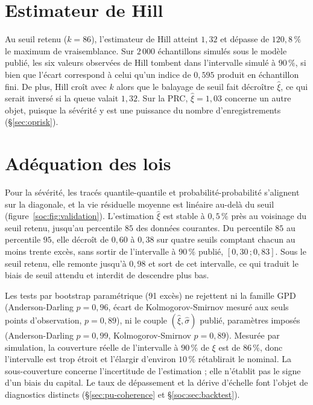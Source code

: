 \section{Estimateur de Hill}


Au seuil retenu ($k=86$), l'estimateur de Hill \citep{Hill1975} atteint $1{,}32$ et dépasse de
$120{,}8\,\%$ le maximum de vraisemblance. Sur $2\,000$ échantillons simulés sous le modèle publié,
les six valeurs observées de Hill tombent dans l'intervalle simulé à $90\,\%$, si bien que l'écart
correspond à celui qu'un indice de $0{,}595$ produit en échantillon fini. De plus, Hill croît avec $k$ alors que
le balayage de seuil fait décroître $\hat\xi$, ce qui serait inversé si la queue valait $1{,}32$.
Sur la PRC, $\hat\xi = 1{,}03$ concerne un autre objet, puisque la sévérité y est une puissance du
nombre d'enregistrements (\S\ref{sec:oprisk}).

\section{Adéquation des lois}
\label{soc:sec:validation}

Pour la sévérité, les tracés quantile-quantile et probabilité-probabilité s'alignent sur la
diagonale, et la vie résiduelle moyenne est linéaire au-delà du seuil (figure~\ref{soc:fig:validation}).
L'estimation $\hat\xi$ est stable à $0{,}5\,\%$ près au voisinage du seuil retenu, jusqu'au
percentile $85$ des données courantes. Du percentile $85$ au percentile $95$, elle décroît de
$0{,}60$ à $0{,}38$ sur quatre seuils comptant chacun au moins trente excès, sans sortir de
l'intervalle à $90\,\%$ publié, $[0{,}30\,;0{,}83]$. Sous le seuil retenu, elle remonte jusqu'à
$0{,}98$ et sort de cet intervalle, ce qui traduit le biais de seuil attendu et interdit de
descendre plus bas.

Les tests par bootstrap paramétrique (91 excès) ne rejettent ni la famille GPD (Anderson-Darling $p=0{,}96$,
écart de Kolmogorov-Smirnov mesuré aux seuls points d'observation, $p=0{,}89$), ni le couple $(\hat\xi,\hat\sigma)$ publié, paramètres imposés
(Anderson-Darling $p=0{,}99$, Kolmogorov-Smirnov $p=0{,}89$). Mesurée par simulation, la couverture
réelle de l'intervalle à $90\,\%$ de $\xi$ est de $86\,\%$, donc l'intervalle est trop
étroit et l'élargir d'environ $10\,\%$ rétablirait le nominal. La sous-couverture concerne l'incertitude de l'estimation ; elle n'établit pas le signe d'un biais du capital. Le taux de dépassement et la dérive d'échelle font l'objet de diagnostics distincts (\S\ref{sec:pu-coherence} et \S\ref{soc:sec:backtest}).

